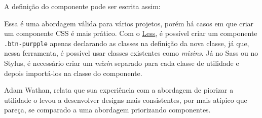 \begin{Shaded}
\begin{Highlighting}[]
\OperatorTok{,} \NormalTok{)}
\end{Highlighting}
\end{Shaded}

A definição do componente pode ser escrita assim:

\begin{Shaded}
\begin{Highlighting}[]
 \OperatorTok{=} \OperatorTok{\{}
    \OperatorTok{:}\KeywordTok{=>} \OperatorTok{\{}
        \OperatorTok{=} \OperatorTok{;}
        \NormalTok{(}\NormalTok{[}\NormalTok{])}\OperatorTok{\{}
            \NormalTok{(}\NormalTok{)}\OperatorTok{:}
\OperatorTok{=} \OperatorTok{;}
                \OperatorTok{;}
            \NormalTok{(}\NormalTok{)}\OperatorTok{:}
\OperatorTok{=} \OperatorTok{;}
                \OperatorTok{;}
        \OperatorTok{\}}
         \NormalTok{(}\SpecialCharTok{$\{}\SpecialCharTok{\}}\OperatorTok{,} \NormalTok{)}
    \OperatorTok{\}}
\OperatorTok{\}}
\end{Highlighting}
\end{Shaded}

Essa é uma abordagem válida para vários projetos, porém há casos em que
criar um componente CSS é mais prático. Com o
\href{http://lesscss.org/}{Less}, é possível criar um componente
\texttt{.btn-purpple} apenas declarando as classes na definição da nova
classe, já que, nessa ferramenta, é possível usar classes existentes
como \emph{mixins}. Já no Sass ou no Stylus, é necessário criar um
\emph{mixin} separado para cada classe de utilidade e depois importá-los
na classe do componente.

Adam Wathan, relata que sua experiência com a abordagem de piorizar a
utilidade o levou a desenvolver designs mais consistentes, por mais
atípico que pareça, se comparado a uma abordagem priorizando
componentes.


